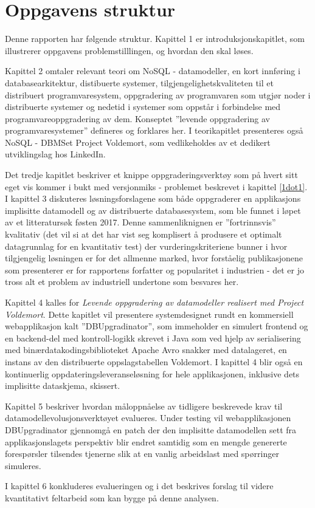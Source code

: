 \section{Oppgavens struktur}

Denne rapporten har følgende struktur. Kapittel 1 er introduksjonskapitlet, som illustrerer oppgavens problemstilllingen, og hvordan den skal løses.

Kapittel 2 omtaler relevant teori om NoSQL - datamodeller, en kort innføring i databasearkitektur, distibuerte systemer, tilgjengelighetskvaliteten til et distribuert programvaresystem, oppgradering av programvaren som utgjør noder i distribuerte systemer og nedetid i systemer som oppstår i forbindelse med programvareoppgradering av dem. Konseptet ''levende oppgradering av programvaresystemer'' defineres og forklares her. I teorikapitlet presenteres også NoSQL - DBMSet Project Voldemort, som vedlikeholdes av et dedikert utviklingslag hos LinkedIn.

Det tredje kapitlet beskriver et knippe oppgraderingsverktøy som på hvert sitt eget vis kommer i bukt med versjonmiks - problemet beskrevet i kapittel \ref{1dot1}. I kapittel 3 diskuteres løsningsforslagene som både oppgraderer en applikasjons implisitte datamodell og av distribuerte databasesystem, som ble funnet i løpet av et litteratursøk føsten 2017. Denne sammenliknignen er ''fortrinnsvis'' kvalitativ (det vil si at det har vist seg komplisert å produsere et optimalt datagrunnlag for en kvantitativ test) der vurderingskriteriene bunner i hvor tilgjengelig løsningen er for det allmenne marked, hvor forståelig publikasjonene som presenterer er for rapportens forfatter og popularitet i industrien - det er jo tross alt et problem av industriell undertone som besvares her.

Kapittel 4 kalles for \emph{Levende oppgradering av datamodeller realisert med Project Voldemort}. Dette kapitlet vil presentere systemdesignet rundt en kommersiell webapplikasjon kalt ''DBUpgradinator'', som immeholder en simulert frontend og en backend-del med kontroll-logikk skrevet i Java som ved hjelp av serialisering med binærdatakodingsbiblioteket Apache Avro snakker med datalageret, en instans av den distribuerte oppslagstabellen Voldemort. I kapittel 4 blir også en kontinuerlig oppdateringsleveranseløsning for hele applikasjonen, inklusive dets implisitte dataskjema, skissert.

Kapittel 5 beskriver hvordan måloppnåelse av tidligere beskrevede krav til datamodellevolusjonsverktøyet evalueres. Under testing vil webapplikasjonen DBUpgradinator gjennomgå en patch der den implisitte datamodellen sett fra applikasjonslagets perspektiv blir endret samtidig som en mengde genererte forespørsler tilsendes tjenerne slik at en vanlig arbeidslast med spørringer simuleres.

I kapittel 6 konkluderes evalueringen og i det beskrives forslag til videre kvantitativt feltarbeid som kan bygge på denne analysen.
